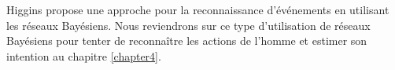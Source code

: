 \documentclass[a4paper,11pt,twoside]{StyleThese}
\begin{document}



Higgins \cite{higgins2005automatic} propose une approche pour la reconnaissance d'événements en utilisant les réseaux Bayésiens.
Nous reviendrons sur ce type d'utilisation de réseaux Bayésiens pour tenter de reconnaître les actions de l'homme et estimer son intention au chapitre \ref{chapter4}.
\end{document}
